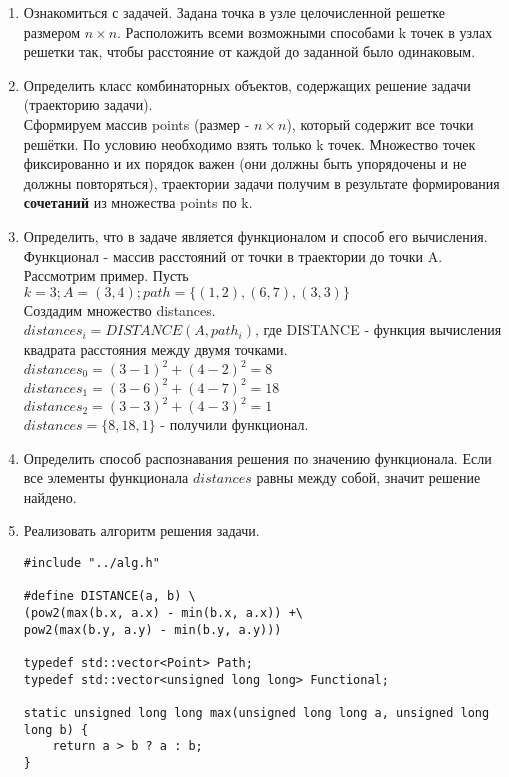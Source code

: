 \documentclass[a4paper,14pt]{extarticle}
\begin{document}
	\begin{enumerate}[№1. ]
		\item Ознакомиться с задачей.\bigbreak
		Задана точка в узле целочисленной решетке размером $n \times n$. Расположить всеми возможными способами k точек в узлах решетки так, чтобы расстояние от каждой до заданной было одинаковым.
		\item Определить класс комбинаторных объектов, содержащих решение задачи (траекторию задачи).\\
		Сформируем массив points (размер - $n \times n$), который содержит все точки решётки. По условию необходимо взять только k точек. Множество точек фиксированно и их порядок важен (они должны быть упорядочены и не должны повторяться), траектории задачи получим в результате формирования \textbf{сочетаний} из множества points по k.\\
		\item Определить, что в задаче является функционалом и способ его вычисления.\bigbreak
		Функционал - массив расстояний от точки в траектории до точки A.\\
		Рассмотрим пример. Пусть $k=3; A=(3, 4); path=\{(1, 2), (6, 7), (3, 3)\}$\\
		Создадим множество distances.\\
		$distances_i=DISTANCE(A, path_i)$, где DISTANCE - функция вычисления квадрата расстояния между двумя точками. \\
		$distances_0=(3 - 1)^2 + (4 - 2)^2 = 8$\\
		$distances_1=(3 - 6)^2 + (4 - 7)^2 = 18$\\
		$distances_2=(3 - 3)^2 + (4 - 3)^2 = 1$\\
		$distances = \{8, 18, 1\}$ - получили функционал.
		\item Определить способ распознавания решения по значению функционала.\bigbreak
		Если все элементы функционала $distances$ равны между собой, значит решение найдено.
		\item Реализовать алгоритм решения задачи.\bigbreak
		\begin{verbatim}
#include "../alg.h"

#define DISTANCE(a, b) \
(pow2(max(b.x, a.x) - min(b.x, a.x)) +\
pow2(max(b.y, a.y) - min(b.y, a.y)))

typedef std::vector<Point> Path;
typedef std::vector<unsigned long long> Functional;

static unsigned long long max(unsigned long long a, unsigned long long b) {
	return a > b ? a : b;
}


\end{verbatim}
\end{enumerate}
\end{document}
